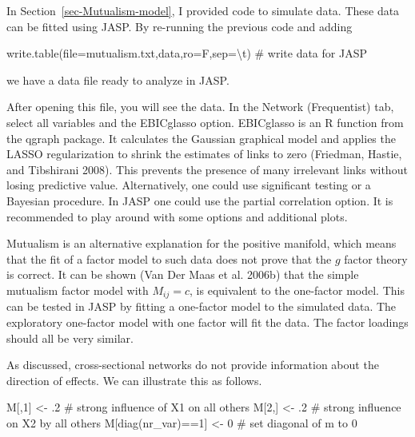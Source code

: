 \documentclass[
  a4paper,
  DIV=11,
  numbers=noendperiod,
  oneside]{scrreprt}
\newenvironment{Shaded}{\begin{snugshade}}{\end{snugshade}}
\newcommand{\AttributeTok}[1]{\textcolor[rgb]{0.40,0.45,0.13}{#1}}
\newcommand{\CommentTok}[1]{\textcolor[rgb]{0.37,0.37,0.37}{#1}}
\newcommand{\DecValTok}[1]{\textcolor[rgb]{0.68,0.00,0.00}{#1}}
\newcommand{\FunctionTok}[1]{\textcolor[rgb]{0.28,0.35,0.67}{#1}}
\newcommand{\NormalTok}[1]{\textcolor[rgb]{0.00,0.23,0.31}{#1}}
\newcommand{\OtherTok}[1]{\textcolor[rgb]{0.00,0.23,0.31}{#1}}
\newcommand{\SpecialCharTok}[1]{\textcolor[rgb]{0.37,0.37,0.37}{#1}}
\newcommand{\StringTok}[1]{\textcolor[rgb]{0.13,0.47,0.30}{#1}}
\begin{document}
In Section~\ref{sec-Mutualism-model}, I provided code to simulate data.
These data can be fitted using JASP. By re-running the previous code and
adding

\begin{Shaded}
\begin{Highlighting}[]
\FunctionTok{write.table}\NormalTok{(}\AttributeTok{file=}\StringTok{\textquotesingle{}mutualism.txt\textquotesingle{}}\NormalTok{,data,}\AttributeTok{ro=}\NormalTok{F,}\AttributeTok{sep=}\StringTok{\textquotesingle{}}\SpecialCharTok{\textbackslash{}t}\StringTok{\textquotesingle{}}\NormalTok{) }\CommentTok{\# write data for JASP}
\end{Highlighting}
\end{Shaded}

we have a data file ready to analyze in JASP.

After opening this file, you will see the data. In the Network
(Frequentist) tab, select all variables and the EBICglasso option.
EBICglasso is an R function from the qgraph package. It calculates the
Gaussian graphical model and applies the LASSO regularization to shrink
the estimates of links to zero (Friedman, Hastie, and Tibshirani 2008).
This prevents the presence of many irrelevant links without losing
predictive value. Alternatively, one could use significant testing or a
Bayesian procedure. In JASP one could use the partial correlation
option. It is recommended to play around with some options and
additional plots.

Mutualism is an alternative explanation for the positive manifold, which
means that the fit of a factor model to such data does not prove that
the \(g\) factor theory is correct. It can be shown (Van Der Maas et al.
2006b) that the simple mutualism factor model with \(M_{ij} = c\), is
equivalent to the one-factor model. This can be tested in JASP by
fitting a one-factor model to the simulated data. The exploratory
one-factor model with one factor will fit the data. The factor loadings
should all be very similar.

As discussed, cross-sectional networks do not provide information about
the direction of effects. We can illustrate this as follows.

\begin{Shaded}
\begin{Highlighting}[]
\NormalTok{M[,}\DecValTok{1}\NormalTok{] }\OtherTok{\textless{}{-}}\NormalTok{ .}\DecValTok{2} \CommentTok{\# strong influence of X1 on all others}
\NormalTok{M[}\DecValTok{2}\NormalTok{,] }\OtherTok{\textless{}{-}}\NormalTok{ .}\DecValTok{2} \CommentTok{\# strong influence on X2 by all others}
\NormalTok{M[}\FunctionTok{diag}\NormalTok{(nr\_var)}\SpecialCharTok{==}\DecValTok{1}\NormalTok{] }\OtherTok{\textless{}{-}} \DecValTok{0} \CommentTok{\# set diagonal of m to 0}
\end{Highlighting}
\end{Shaded}
\end{document}
